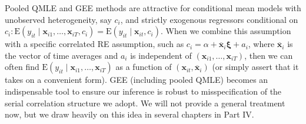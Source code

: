 \documentclass[10pt]{article}
\begin{document}
Pooled QMLE and GEE methods are attractive for conditional mean models with unobserved heterogeneity, say $c_{i}$, and strictly exogenous regressors conditional on $c_{i}: \mathrm{E}\left(y_{i t} \mid \mathbf{x}_{i 1}, \ldots, \mathbf{x}_{i T}, c_{i}\right)=\mathrm{E}\left(y_{i t} \mid \mathbf{x}_{i t}, c_{i}\right)$. When we combine this assumption with a specific correlated RE assumption, such as $c_{i}=\alpha+\overline{\mathbf{x}}_{i} \boldsymbol{\xi}+a_{i}$, where $\overline{\mathbf{x}}_{i}$ is the vector of time averages and $a_{i}$ is independent of $\left(\mathbf{x}_{i 1}, \ldots, \mathbf{x}_{i T}\right)$, then we can often find $\mathrm{E}\left(y_{i t} \mid \mathbf{x}_{i 1}, \ldots, \mathbf{x}_{i T}\right)$ as a function of $\left(\mathbf{x}_{i t}, \overline{\mathbf{x}}_{i}\right)$ (or simply assert that it takes on a convenient form). GEE (including pooled QMLE) becomes an indispensable tool to ensure our inference is robust to misspecification of the serial correlation structure we adopt. We will not provide a general treatment now, but we draw heavily on this idea in several chapters in Part IV.
\end{document}
